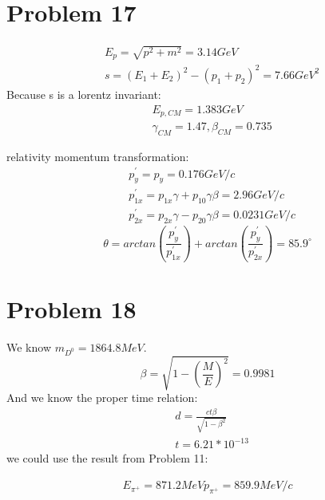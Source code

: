 \documentclass{article}
\begin{document}
\begin{CJK*}{GBK}{song}
\section{Problem 17}
\begin{equation}
\begin{aligned}
&E_p=\sqrt{p^2+m^2}=3.14GeV\\
&s=(E_1+E_2)^2-(p_1+p_2)^2=7.66GeV^2
\end{aligned}
\end{equation}
Because s is a lorentz invariant:
\begin{equation}
\begin{aligned}
&E_{p,CM}=1.383GeV\\
&\gamma_{CM}=1.47, \beta_{CM}=0.735
\end{aligned}
\end{equation}

relativity momentum transformation:
\begin{equation}
\begin{aligned}
&p^{'}_y=p_y=0.176GeV/c\\
&p_{1x}^{'}=p_{1x}\gamma+p_{10}\gamma\beta=2.96GeV/c\\
&p_{2x}^{'}=p_{2x}\gamma-p_{20}\gamma\beta=0.0231GeV/c
\end{aligned}
\end{equation}
\begin{equation}
\theta=arctan(\frac{p^{'}_y}{p^{'}_{1x}})+arctan(\frac{p^{'}_y}{p^{'}_{2x}})=85.9^{\circ}
\end{equation}

\section{Problem 18}
We know $m_{D^0}=1864.8MeV.$
\begin{equation}
\beta=\sqrt{1-(\frac{M}{E})^2}=0.9981
\end{equation}
And we know the proper time relation:
\begin{equation}
\begin{aligned}
&d=\frac{ct\beta}{\sqrt{1-\beta^2}}\\
&t=6.21*10^{-13}
\end{aligned}
\end{equation}
we could use the result from Problem 11:

\begin{equation}
\begin{aligned}
E_{\pi^+}=871.2MeV
p_{\pi^+}=859.9MeV/c
\end{aligned}
\end{equation}


\end{CJK*}
\end{document}
